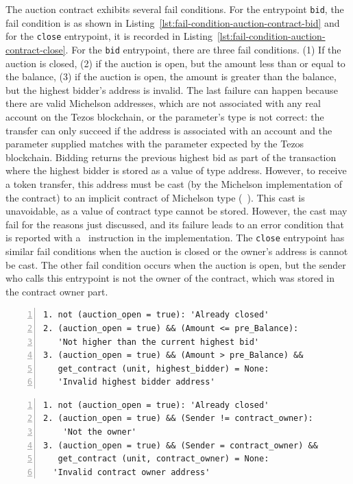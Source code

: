 \documentclass[a4paper,USenglish,cleveref, autoref, thm-restate]{lipics-v2021}
\begin{document}
The auction contract exhibits several fail conditions. For the
entrypoint \lstinline/bid/, the fail condition is as shown in
Listing~\ref{lst:fail-condition-auction-contract-bid} and for the
\lstinline/close/ entrypoint, it is recorded in
Listing~\ref{lst:fail-condition-auction-contract-close}. For the
\lstinline/bid/ entrypoint, there are three fail conditions.  (1) If
the auction is closed, (2) if the auction is open, but the amount less
than or equal to the balance, (3) if the auction is open, the amount
is greater than the balance, but the highest bidder's address is
invalid. The last failure can happen because there are valid Michelson
addresses, which are not associated with any real account on the Tezos
blockchain, or the parameter's type is not correct: the transfer can
only succeed if the address is associated with an account and the
parameter supplied matches with the parameter expected by the Tezos
blockchain. Bidding returns the previous highest bid as part of the
transaction where the highest bidder is stored as a value of type
address. However, to receive a token transfer, this address must be
cast (by the Michelson implementation of the contract) to an implicit
contract of Michelson type (\TCONTRACT\ \TUNIT). This cast is
unavoidable, as a value of contract type cannot be stored.  However,
the cast may fail for the reasons just discussed, and its failure
leads to an error condition that is reported with a \FAILWITH\
instruction in the implementation. The \lstinline/close/ entrypoint has
similar fail conditions when the auction is closed or the owner's
address is cannot be cast. The other fail condition occurs when the
auction is open, but the sender who calls this entrypoint is not the
owner of the contract, which was stored in the contract owner part.

\begin{lstlisting}[float=tp,captionpos=b,caption={Fail condition for auction contract bid entrypoint },label={lst:fail-condition-auction-contract-bid},numbers=left]
1. not (auction_open = true): 'Already closed'
2. (auction_open = true) && (Amount <= pre_Balance):
   'Not higher than the current highest bid'
3. (auction_open = true) && (Amount > pre_Balance) && 
   get_contract (unit, highest_bidder) = None:
   'Invalid highest bidder address' 
\end{lstlisting}

\begin{lstlisting}[float=tp,captionpos=b,caption={Fail condition for auction contract close entrypoint},label={lst:fail-condition-auction-contract-close},numbers=left]
1. not (auction_open = true): 'Already closed'
2. (auction_open = true) && (Sender != contract_owner): 
    'Not the owner'
3. (auction_open = true) && (Sender = contract_owner) &&
   get_contract (unit, contract_owner) = None:
  'Invalid contract owner address'
\end{lstlisting}
\end{document}
